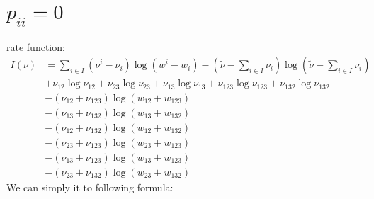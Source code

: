 \documentclass[11pt,en,cite=authoryear]{elegantpaper}
\begin{document}
\section{$p_{ii}=0$}
rate function:
\begin{align*}
    I(\nu)
    &= \sum_{i \in I} (\nu^{i}-\nu_{i}) \log (w^{i}-w_{i})
    - (\tilde{\nu} - \sum_{i \in I} \nu_{i}) \log (\tilde{\nu} - \sum_{i \in I} \nu_{i}) \\
    &+ \nu_{12} \log \nu_{12} + \nu_{23} \log \nu_{23} + \nu_{13} \log \nu_{13} +\nu_{123} \log \nu_{123} + \nu_{132} \log \nu_{132} \\
    &- (\nu_{12} + \nu_{123}) \log(w_{12} + w_{123}) \\
    &- (\nu_{13} + \nu_{132}) \log(w_{13} + w_{132}) \\
    &- (\nu_{12} + \nu_{132}) \log(w_{12} + w_{132}) \\
    &- (\nu_{23} + \nu_{123}) \log(w_{23} + w_{123}) \\
    &- (\nu_{13} + \nu_{123}) \log(w_{13} + w_{123}) \\
    &- (\nu_{23} + \nu_{132}) \log(w_{23} + w_{132}) 
\end{align*}
We can simply it to following formula:
\end{document}
